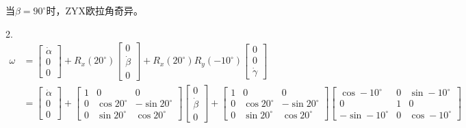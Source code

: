 \documentclass[UTF8, 12pt]{ctexart}
\begin{document}
当\(\beta = 90^\circ\)时，ZYX欧拉角奇异。

\newpage


2.
\[
\begin{aligned}
    \omega &= \begin{bmatrix}
                \dot{\alpha} \\
                0 \\
                0
            \end{bmatrix}
            + R_x(20^\circ)
            \begin{bmatrix}
                0 \\
                \dot{\beta} \\
                0
            \end{bmatrix}
            + R_x(20^\circ)R_y(-10^\circ)
            \begin{bmatrix}
                0 \\
                0 \\
                \dot{\gamma}
            \end{bmatrix} \\
    &= \begin{bmatrix}
        \dot{\alpha} \\
        0 \\
        0
        \end{bmatrix}
        + \begin{bmatrix}
            1 & 0 & 0 \\
            0 & \cos20^\circ & -\sin20^\circ \\
            0 & \sin20^\circ & \cos20^\circ
        \end{bmatrix}
        \begin{bmatrix}
            0 \\
            \dot{\beta} \\
            0
        \end{bmatrix}
        + \begin{bmatrix}
            1 & 0 & 0 \\
            0 & \cos20^\circ & -\sin20^\circ \\
            0 & \sin20^\circ & \cos20^\circ
        \end{bmatrix}
        \begin{bmatrix}
            \cos-10^\circ & 0 & \sin-10^\circ \\
            0 & 1 & 0 \\
            -\sin-10^\circ & 0 & \cos-10^\circ
        \end{bmatrix}

\end{aligned}\]
\end{document}
